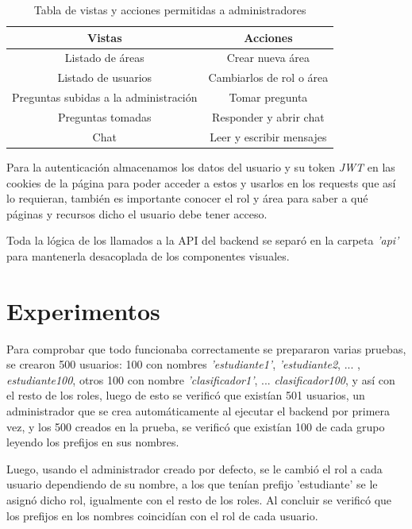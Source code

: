 	\begin{table}[h]
	\begin{center}
		\begin{tabular}{| c | c |}
			\hline
			Vistas & Acciones \\ \hline
			Listado de áreas & Crear nueva área \\ \hline 
			Listado de usuarios & Cambiarlos de rol o área  \\ \hline 
			Preguntas subidas a la administración & Tomar pregunta \\ \hline 
			Preguntas tomadas & Responder y abrir chat  \\ \hline 
			Chat & Leer y escribir mensajes  \\ \hline 
		\end{tabular}
		\caption{Tabla de vistas y acciones permitidas a administradores}
		\label{table:admin_views}
		
	\end{center}
\end{table}

Para la autenticación almacenamos los datos del usuario y su token \textit{JWT} en las cookies de la página para poder acceder a estos y usarlos en los requests que así lo requieran, también es importante conocer el rol y área para saber a qué páginas y recursos dicho el usuario debe tener acceso.
\newline

Toda la lógica de los llamados a la API del backend se separó en la carpeta \textit{'api'} para mantenerla desacoplada de los componentes visuales.

\section{Experimentos}

Para comprobar que todo funcionaba correctamente se prepararon varias pruebas, se crearon 500 usuarios: 100 con nombres \textit{'estudiante1'}, \textit{'estudiante2}, ... , \textit{estudiante100}, otros 100 con nombre \textit{'clasificador1'}, ... \textit{clasificador100}, y así con el resto de los roles, luego de esto se verificó que existían 501 usuarios, un administrador que se crea automáticamente al ejecutar el backend por primera vez, y los 500 creados en la prueba, se verificó que existían 100 de cada grupo leyendo los prefijos en sus nombres.
\newline

Luego, usando el administrador creado por defecto, se le cambió el rol a cada usuario dependiendo de su nombre, a los que tenían prefijo 'estudiante' se le asignó dicho rol, igualmente con el resto de los roles. Al concluir se verificó que los prefijos en los nombres coincidían con el rol de cada usuario.
\newline


